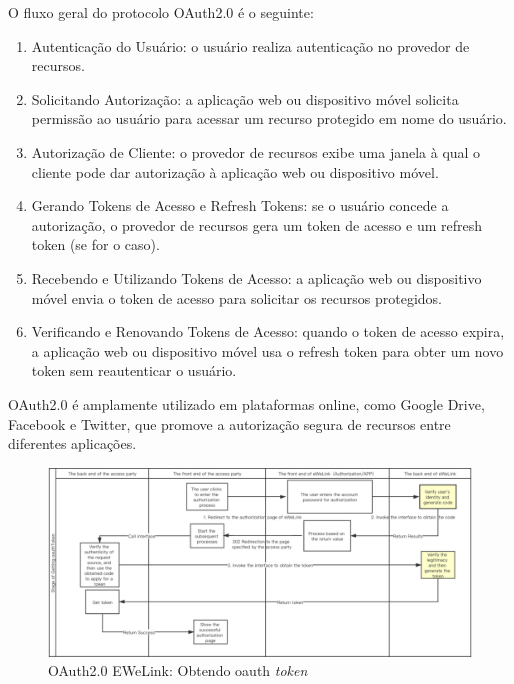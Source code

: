 O fluxo geral do protocolo OAuth2.0 é o seguinte:

\begin{enumerate}
  \item Autenticação do Usuário: o usuário realiza autenticação no provedor de recursos.
  \item Solicitando Autorização: a aplicação web ou dispositivo móvel solicita permissão ao usuário para acessar um recurso protegido em nome do usuário.
  \item Autorização de Cliente: o provedor de recursos exibe uma janela à qual o cliente pode dar autorização à aplicação web ou dispositivo móvel.
  \item Gerando Tokens de Acesso e Refresh Tokens: se o usuário concede a autorização, o provedor de recursos gera um token de acesso e um refresh token (se for o caso).
  \item Recebendo e Utilizando Tokens de Acesso: a aplicação web ou dispositivo móvel envia o token de acesso para solicitar os recursos protegidos.
  \item Verificando e Renovando Tokens de Acesso: quando o token de acesso expira, a aplicação web ou dispositivo móvel usa o refresh token para obter um novo token sem reautenticar o usuário.
\end{enumerate}

OAuth2.0 é amplamente utilizado em plataformas online, como Google Drive, Facebook e Twitter, que promove a autorização segura de recursos entre diferentes aplicações.

\begin{figure}[htp]
	\caption{\label{fig:oauth1}OAuth2.0 EWeLink: Obtendo oauth \textit{token}}
	\begin{center}
	  \includegraphics[scale=0.45]{images/cap5/oauth_1.png}
	\end{center}
\end{figure}

